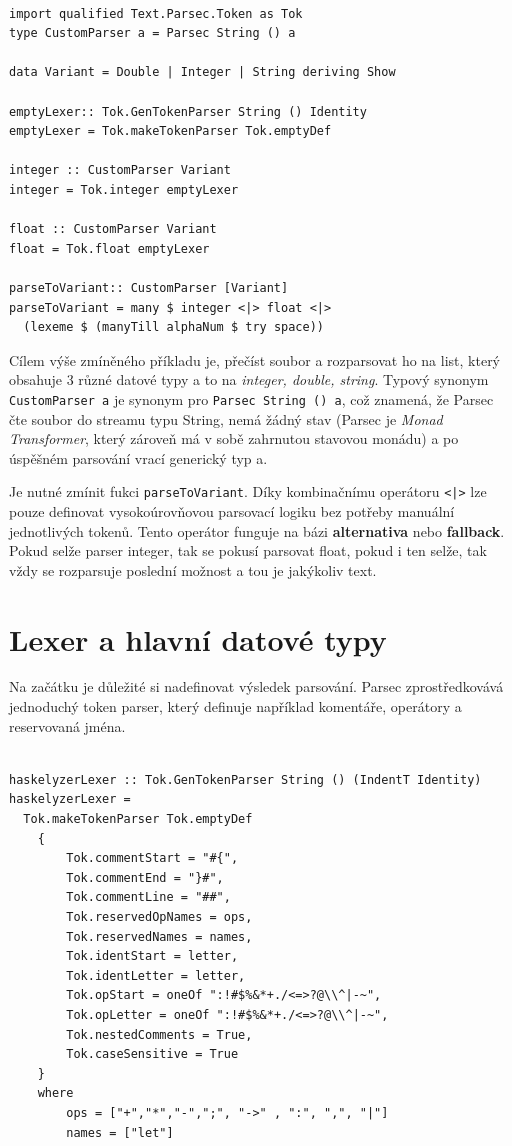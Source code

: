 \documentclass[male,czech]{kithesis}
\newcommand{\haskellInline}[1]{\colorbox{gray!10}{\texttt{#1}}}
\begin{document}
\begin{verbatim}

import qualified Text.Parsec.Token as Tok
type CustomParser a = Parsec String () a

data Variant = Double | Integer | String deriving Show

emptyLexer:: Tok.GenTokenParser String () Identity
emptyLexer = Tok.makeTokenParser Tok.emptyDef

integer :: CustomParser Variant 
integer = Tok.integer emptyLexer 

float :: CustomParser Variant 
float = Tok.float emptyLexer 

parseToVariant:: CustomParser [Variant]
parseToVariant = many $ integer <|> float <|> 
  (lexeme $ (manyTill alphaNum $ try space))

\end{verbatim}

Cílem výše zmíněného příkladu je, přečíst soubor a rozparsovat ho na list, 
který obsahuje 3 různé datové typy a to na \textit{integer, double, string}.
Typový synonym \haskellInline{CustomParser a} je synonym pro \haskellInline{Parsec String () a},
což znamená, že Parsec čte soubor do streamu typu String, nemá žádný stav (Parsec je \textit{Monad Transformer},
který zároveň má v sobě zahrnutou stavovou monádu) a po úspěšném parsování 
vrací generický typ a. 

Je nutné zmínit fukci \haskellInline{parseToVariant}. Díky kombinačnímu operátoru \haskellInline{<|>} 
lze pouze definovat vysokoúrovňovou parsovací logiku bez potřeby manuální jednotlivých tokenů. 
Tento operátor funguje na bázi \textbf{alternativa} nebo
\textbf{fallback}. Pokud selže parser integer, tak se pokusí parsovat float, pokud i ten selže, tak vždy se 
rozparsuje poslední možnost a tou je jakýkoliv text.

\section{Lexer a hlavní datové typy}

Na začátku je důležité si nadefinovat výsledek parsování. Parsec zprostředkovává 
jednoduchý token parser, který definuje například komentáře, operátory a reservovaná
jména.

\begin{verbatim}

haskelyzerLexer :: Tok.GenTokenParser String () (IndentT Identity)
haskelyzerLexer =
  Tok.makeTokenParser Tok.emptyDef 
    { 
        Tok.commentStart = "#{",
        Tok.commentEnd = "}#",
        Tok.commentLine = "##",
        Tok.reservedOpNames = ops,
        Tok.reservedNames = names,
        Tok.identStart = letter,
        Tok.identLetter = letter,
        Tok.opStart = oneOf ":!#$%&*+./<=>?@\\^|-~",
        Tok.opLetter = oneOf ":!#$%&*+./<=>?@\\^|-~",
        Tok.nestedComments = True,
        Tok.caseSensitive = True
    }
    where
        ops = ["+","*","-",";", "->" , ":", ",", "|"]
        names = ["let"]

\end{verbatim}
\end{document}
